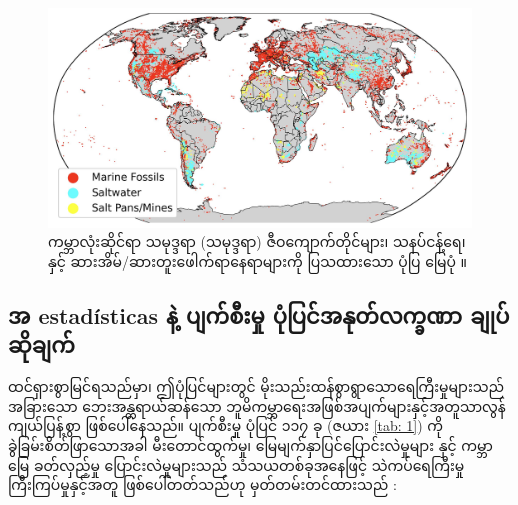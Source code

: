 \documentclass[10pt,twocolumn,letterpaper]{article}
\begin{document}
\begin{figure}[b]
\begin{center}

\includegraphics[width=1\textwidth]{marine.jpg}
\end{center}
   \caption{ကမ္ဘာလုံးဆိုင်ရာ သမုဒ္ဒရာ (သမုဒ္ဒရာ) ဇီဝကျောက်တိုင်များ၊ သနပ်ငန့်ရေ၊ နှင့် ဆားအိမ်/ဆားတူးဖေါက်ရာနေရာများကို ပြသထားသော ပုံပြ မြေပုံ \cite{15,16,86,87}။}
   \label{fig:2}
\end{figure}

\subsection{အ estadísticas နဲ့ ပျက်စီးမှု ပုံပြင်အနုတ်လက္ခဏာ ချုပ်ဆိုချက်}

ထင်ရှားစွာမြင်ရသည်မှာ၊ ဤပုံပြင်များတွင် မိုးသည်းထန်စွာရွာသောရေကြီးမှုများသည် အခြားသော ဘေးအန္တရာယ်ဆန်သော ဘူမိကမ္ဘာရေးအဖြစ်အပျက်များနှင့်အတူသာလွန်ကျယ်ပြန့်စွာ ဖြစ်ပေါ်နေသည်။ ပျက်စီးမှု ပုံပြင် ၁၁၇ ခု (ဇယား \ref{tab: 1}) ကိုခွဲခြမ်းစိတ်ဖြာသောအခါ မီးတောင်ထွက်မှု၊ မြေမျက်နှာပြင်ပြောင်းလဲမှုများ နှင့် ကမ္ဘာမြေ ခတ်လှည့်မှု ပြောင်းလဲမှုများသည် သံသယတစ်ခုအနေဖြင့် သဲကပ်ရေကြီးမှုကြီးကြပ်မှုနှင့်အတူ ဖြစ်ပေါ်တတ်သည်ဟု မှတ်တမ်းတင်ထားသည် \cite{14}:
\end{document}
